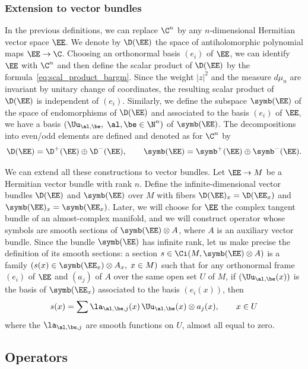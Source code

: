 \subsubsection{Extension to vector bundles}
In the previous definitions, we can replace $\C^n$ by any $n$-dimensional Hermitian vector space $\EE$. We denote by $\D (\EE)$ the space of antiholomorphic polynomial maps $\EE \rightarrow
\C$. Choosing an orthonormal basis $(e_i)$ of $\EE$, we can identify $\EE$ with $\C^n$ and then define the scalar product of $\D (\EE)$ by the formula~\eqref{eq:scal_product_bargm}. Since the weight $|z|^2$ and the measure $d
\mu_n$ are invariant by unitary change of coordinates, the resulting scalar product of $\D (\EE)$ is independent of $(e_i)$. Similarly, we define the subspace $\symb (\EE)$ of the space of endomorphisms of $\D (\EE)$ and associated to the basis $(e_i)$ of $\EE$, we have a basis $(\Uu_{\al,\be},\;
\al, \be \in \N^n)$ of $\symb (\EE)$. The decompositions into even/odd elements are defined and denoted as for $\C^n$ by
\begin{gather}
\D (\EE) = \D^+ (\EE) \oplus \D^{-} (\EE), \qquad \symb (\EE) = \symb ^{+} (\EE) \oplus
\symb^{-} (\EE).
\end{gather}

We can extend all these constructions to vector bundles. Let $\EE \rightarrow M$ be a Hermitian vector bundle with rank $n$. Define the infinite-dimensional vector bundles $\D (\EE)$ and $\symb (\EE)$ over $M$ with fibers $\D (\EE)_x = \D (\EE_x)$ and $\symb (\EE)_x = \symb (\EE_x)$. Later, we will choose for $\EE$ the complex tangent bundle of an almost-complex manifold, and we will construct operator whose symbols are smooth sections of $\symb (\EE) \otimes A$, where $A$ is an auxiliary vector bundle. Since the bundle $\symb(\EE)$ has infinite rank, let us make precise the definition of its smooth sections: a section $s \in \Ci (M,
\symb (\EE) \otimes A)$ is a family $(s(x) \in \symb (\EE_x) \otimes A_x, \; x \in M)$ such that for any orthonormal frame $(e_i)$ of $\EE$ and $(a_j)$ of $A$ over the same open set $U$ of $M$, if $(\Uu_{\al,
\be}(x))$ is the basis of $\symb (\EE_x)$ associated to the basis $(e_i(x))$, then
\[
s (x) = \sum \la_{\al,\be,j} (x) \, \Uu_{\al,\be} (x) \otimes a_j(x), \qquad
x \in U
\]
where the $\la_{\al, \be, j} $ are smooth functions on $U$, almost all equal to zero.


\subsection{Operators} \label{sec:operators}

